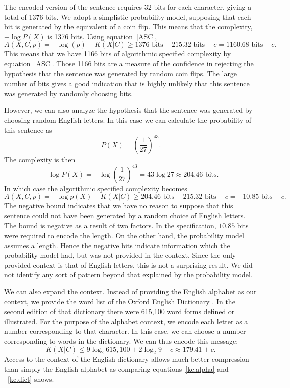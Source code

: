 The encoded version of the sentence requires 32 bits for each character, giving a total of 1376 bits.
We adopt a simplistic probability model, supposing that each bit is generated by the equivalent of a coin flip.
This means that the complexity, $-\log P(X)$ is 1376 bits.
Using equation~\ref{ASC},
\begin{equation}
    A(X,C,p) = -\log(p) - K(X|C) \geq 1376 \mbox{ bits} - 215.32 \mbox{ bits} - c  = 1160.68 \mbox{ bits} - c \mbox{.}
\end{equation}
This means that we have 1166 bits of algorithmic specified complexity by equation~\ref{ASC}.
Those 1166 bits are a measure of the confidence in rejecting the hypothesis that the sentence was generated by random coin flips.
The large number of bits gives a good indication that is highly unlikely that this sentence was generated by randomly choosing bits.

However, we can also analyze the hypothesis that the sentence was generated by choosing random English letters.
In this case we can calculate the probability of this sentence as
\begin{equation}
    P(X) = \left(\frac{1}{27}\right)^{43} \mbox{.}
\end{equation}
The complexity is then
\begin{equation}
    -\log P(X) = -\log \left(\frac{1}{27}\right)^{43} = 43 \log 27 \approx 204.46 \mbox{ bits.}
\end{equation}
In which case the algorithmic specified complexity becomes
\begin{equation}
    A(X,C,p) = - \log p(X) - K(X|C) \geq 204.46 \mbox{ bits} - 215.32 \mbox{ bits} - c = -10.85 \mbox{ bits} - c \mbox{.}
\end{equation}
The negative bound indicates that we have no reason to suppose that this sentence could not have been generated by a random choice of English letters.
The bound is negative as a result of two factors.
In the specification, $10.85$ bits were required to encode the length.
On the other hand, the probability model assumes a length.
Hence the negative bits indicate information which the probability model had, but was not provided in the context.
Since the only provided context is that of English letters, this is not a surprising result.
We did not identify any sort of pattern beyond that explained by the probability model.

We can also expand the context.
Instead of providing the English alphabet as our context, we provide the word list of the Oxford English Dictionary \citep{Oxford2012}.
In the second edition of that dictionary there were 615,100 word forms defined or illustrated.
For the purpose of the alphabet context, we encode each letter as a number corresponding to that character.
In this case, we can choose a number corresponding to words in the dictionary.
We can thus encode this message:
\begin{equation}
    \label{kc.dict}
    K(X|C) \leq 9 \log_2  615,100 + 2 \log_2 9 + c \approx 179.41 + c \mbox{.}
\end{equation}
Access to the context of the English dictionary allows much better compression than simply the English alphabet as comparing equations~\ref{kc.alpha} and ~\ref{kc.dict} shows.

